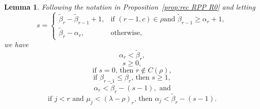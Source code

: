 \documentclass[12pt]{amsart}
\numberwithin{equation}{section}
\newtheorem{lem}[thm]{Lemma}
\theoremstyle{definition}
\newcommand\wb{\widetilde{\beta}}
\begin{document}
\begin{lem}\label{lem:s-1}
  Following the notation in Proposition~\ref{prop:rec RPP R0}
  and letting
        \[
s = \begin{cases}
  \wb_r-\wb_{r-1}+1, & \mbox{if $(r-1,c)\in\rho$
  and $\wb_{r-1}\ge\alpha_r+1$} ,\\
\wb_r-\alpha_r, &\mbox{otherwise},
\end{cases}
  \]
 we have
 \begin{equation}
   \label{eq:8a}
   \alpha_r < \wb_r,
 \end{equation}
  \begin{equation}
    \label{eq:s>0}
   s \ge 0,
 \end{equation}
 \begin{equation}
   \label{eq:s=0-cond}
 \mbox{if $s = 0$, then }  r \notin C(\rho),
 \end{equation}
  \begin{equation}
    \label{eq:s>1}
\mbox{if $\beta_{r-1} \leq \beta_r$, then }   s \ge 1,
 \end{equation}
  \begin{equation}
    \label{eq:8}
     \alpha_r <\wb_r-(s-1), \mbox{ and}
  \end{equation}
  \begin{equation}
    \label{eq:11}
 \mbox{if $j<r$ and $\mu_j<(\lambda-\rho)_r$, then }   \alpha_j<\wb_r-(s-1).
  \end{equation}
\end{lem}
\end{document}
